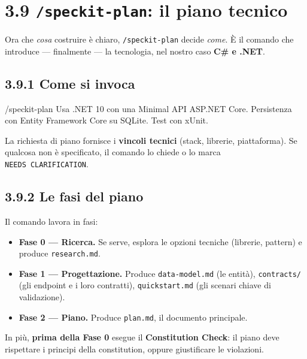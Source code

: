 \documentclass[
  italian,
  10pt,
]{book}
\newenvironment{Shaded}{\begin{snugshade}}{\end{snugshade}}
\newcommand{\NormalTok}[1]{#1}
\providecommand{\tightlist}{%
  \setlength{\itemsep}{0pt}\setlength{\parskip}{0pt}}
\begin{document}
\section{\texorpdfstring{3.9 \texttt{/speckit-plan}: il piano
tecnico}{3.9 /speckit-plan: il piano tecnico}}\label{speckit-plan-il-piano-tecnico}

Ora che \emph{cosa} costruire è chiaro, \texttt{/speckit-plan} decide
\emph{come}. È il comando che introduce --- finalmente --- la
tecnologia, nel nostro caso \textbf{C\# e .NET}.

\subsection{3.9.1 Come si invoca}\label{come-si-invoca-1}

\begin{Shaded}
\begin{Highlighting}[]
\NormalTok{/speckit{-}plan Usa .NET 10 con una Minimal API ASP.NET Core. Persistenza con}
\NormalTok{Entity Framework Core su SQLite. Test con xUnit.}
\end{Highlighting}
\end{Shaded}

La richiesta di piano fornisce i \textbf{vincoli tecnici} (stack,
librerie, piattaforma). Se qualcosa non è specificato, il comando lo
chiede o lo marca \texttt{NEEDS\ CLARIFICATION}.

\subsection{3.9.2 Le fasi del piano}\label{le-fasi-del-piano}

Il comando lavora in fasi:

\begin{itemize}
\tightlist
\item
  \textbf{Fase 0 --- Ricerca.} Se serve, esplora le opzioni tecniche
  (librerie, pattern) e produce \texttt{research.md}.
\item
  \textbf{Fase 1 --- Progettazione.} Produce \texttt{data-model.md} (le
  entità), \texttt{contracts/} (gli endpoint e i loro contratti),
  \texttt{quickstart.md} (gli scenari chiave di validazione).
\item
  \textbf{Fase 2 --- Piano.} Produce \texttt{plan.md}, il documento
  principale.
\end{itemize}

In più, \textbf{prima della Fase 0} esegue il \textbf{Constitution
Check}: il piano deve rispettare i principi della constitution, oppure
giustificare le violazioni.
\end{document}
